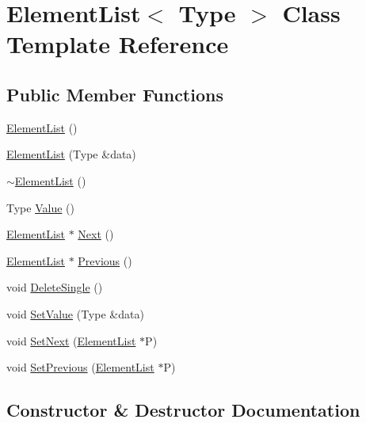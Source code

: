 \hypertarget{class_element_list}{}\section{Element\+List$<$ Type $>$ Class Template Reference}
\label{class_element_list}
\subsection*{Public Member Functions}
\begin{DoxyCompactItemize}
\item 
\hyperlink{class_element_list_a0157b98943770fe3f09bda77d99a8641}{Element\+List} ()
\item 
\hyperlink{class_element_list_a042a80b094d946d3e6526ab8321e32f7}{Element\+List} (Type \&data)
\item 
\hyperlink{class_element_list_adf838c89433130d312b11c7e304b710b}{$\sim$\+Element\+List} ()
\item 
Type \hyperlink{class_element_list_a0f874b08fce53174aa75eedf45682d64}{Value} ()
\item 
\hyperlink{class_element_list}{Element\+List} $\ast$ \hyperlink{class_element_list_a2644dc854591779ec7220fd56e0a16ba}{Next} ()
\item 
\hyperlink{class_element_list}{Element\+List} $\ast$ \hyperlink{class_element_list_a5144ccc57d38ce60ec3d5d82471579f6}{Previous} ()
\item 
void \hyperlink{class_element_list_a55fedd16d90c0b856117e02e837e311e}{Delete\+Single} ()
\item 
void \hyperlink{class_element_list_a7c1472ac483bdef89e6fc5370591b6f7}{Set\+Value} (Type \&data)
\item 
void \hyperlink{class_element_list_af4c19f75c4c93b69f2023420ba477f7d}{Set\+Next} (\hyperlink{class_element_list}{Element\+List} $\ast$P)
\item 
void \hyperlink{class_element_list_a60590a74e879b84d87dc3f32bd9ad801}{Set\+Previous} (\hyperlink{class_element_list}{Element\+List} $\ast$P)
\end{DoxyCompactItemize}


\subsection{Constructor \& Destructor Documentation}
